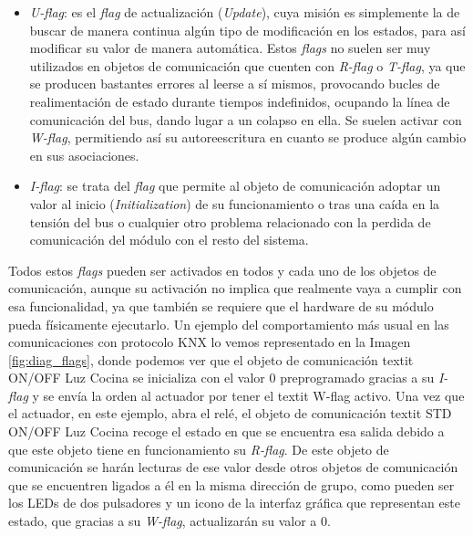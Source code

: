 \begin{itemize}
\item \textit {U-flag}: es el \textit {flag} de actualización (\textit {Update}), cuya misión es simplemente la de buscar de manera continua algún tipo de modificación en los estados, para así modificar su valor de manera automática. Estos \textit{flags} no suelen ser muy utilizados en objetos de comunicación que cuenten con \textit {R-flag} o \textit {T-flag}, ya que se producen bastantes errores al leerse a sí mismos, provocando bucles de realimentación de estado durante tiempos indefinidos, ocupando la línea de comunicación del bus, dando lugar a un colapso en ella. Se suelen activar con \textit {W-flag}, permitiendo así su autoreescritura en cuanto se produce algún cambio en sus asociaciones.
\item \textit {I-flag}: se trata del \textit {flag} que permite al objeto de comunicación adoptar un valor al inicio (\textit {Initialization}) de su funcionamiento o tras una caída en la tensión del bus o cualquier otro problema relacionado con la perdida de comunicación del módulo con el resto del sistema.
\end{itemize}
Todos estos \textit {flags} pueden ser activados en todos y cada uno de los objetos de comunicación, aunque su activación no implica que realmente vaya a cumplir con esa funcionalidad, ya que también se requiere que el hardware de su módulo pueda físicamente ejecutarlo. Un ejemplo del comportamiento más usual en las comunicaciones con protocolo KNX lo vemos representado en la Imagen \ref{fig:diag_flags},  donde podemos ver que el objeto de comunicación textit {ON/OFF Luz Cocina} se inicializa con el valor 0 preprogramado gracias a su \textit {I-flag} y se envía la orden al actuador por tener el textit {W-flag} activo. Una vez que el actuador, en este ejemplo, abra el relé, el objeto de comunicación textit {STD ON/OFF Luz Cocina} recoge el estado en que se encuentra esa salida debido a que este objeto tiene en funcionamiento su \textit {R-flag}. De este objeto de comunicación se harán lecturas de ese valor desde otros objetos de comunicación que se encuentren ligados a él en la misma dirección de grupo, como pueden ser los LEDs de dos pulsadores y un icono de la interfaz gráfica que representan este estado, que gracias a su \textit {W-flag}, actualizarán su valor a 0.\\\\
